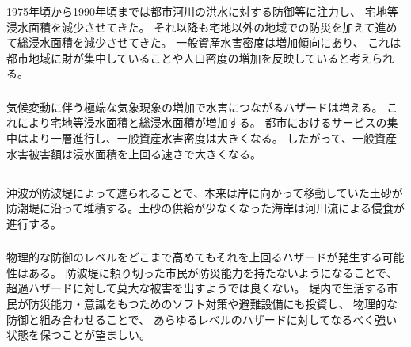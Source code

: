 \documentclass[a4paper]{jsarticle}
\begin{document}
\subsubsection{}
1975年頃から1990年頃までは都市河川の洪水に対する防御等に注力し、
宅地等浸水面積を減少させてきた。
それ以降も宅地以外の地域での防災を加えて進めて総浸水面積を減少させてきた。
一般資産水害密度は増加傾向にあり、
これは都市地域に財が集中していることや人口密度の増加を反映していると考えられる。

\subsubsection{}
気候変動に伴う極端な気象現象の増加で水害につながるハザードは増える。
これにより宅地等浸水面積と総浸水面積が増加する。
都市におけるサービスの集中はより一層進行し、一般資産水害密度は大きくなる。
したがって、一般資産水害被害額は浸水面積を上回る速さで大きくなる。

\subsection{}
\subsubsection{}
沖波が防波堤によって遮られることで、本来は岸に向かって移動していた土砂が
防潮堤に沿って堆積する。土砂の供給が少なくなった海岸は河川流による侵食が進行する。

\subsubsection{}
物理的な防御のレベルをどこまで高めてもそれを上回るハザードが発生する可能性はある。
防波堤に頼り切った市民が防災能力を持たないようになることで、
超過ハザードに対して莫大な被害を出すようでは良くない。
堤内で生活する市民が防災能力・意識をもつためのソフト対策や避難設備にも投資し、
物理的な防御と組み合わせることで、
あらゆるレベルのハザードに対してなるべく強い状態を保つことが望ましい。
\end{document}
